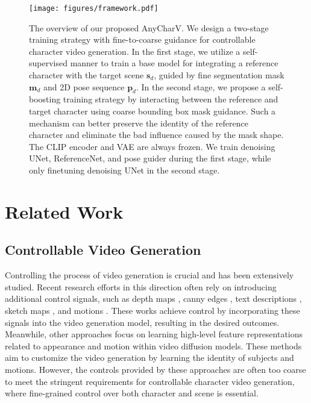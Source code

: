 \begin{figure*}[t]
    \centering
    \texttt{[image: figures/framework.pdf]}
    \caption{The overview of our proposed AnyCharV. We design a two-stage training strategy with fine-to-coarse guidance for controllable character video generation. In the first stage, we utilize a self-supervised manner to train a base model for integrating a reference character with the target scene $\boldsymbol{s}_d$, guided by fine segmentation mask $\boldsymbol{m}_d$ and 2D pose sequence $\boldsymbol{p}_d$. In the second stage, we propose a self-boosting training strategy by interacting between the reference and target character using coarse bounding box mask guidance. Such a mechanism can better preserve the identity of the reference character and eliminate the bad influence caused by the mask shape. The CLIP encoder and VAE are always frozen. We train denoising UNet, ReferenceNet, and pose guider during the first stage, while only finetuning denoising UNet in the second stage.}
    \label{fig:framework}
\end{figure*}



\section{Related Work}

\subsection{Controllable Video Generation}
Controlling the process of video generation is crucial and has been extensively studied. 
Recent research efforts in this direction often rely on introducing additional control signals, such as depth maps \cite{chai2023stablevideo, zhang2023controlvideo, wang2024videocomposer}, canny edges \cite{zhang2023controlvideo}, text descriptions \cite{zhang2023i2vgen}, sketch maps \cite{wang2024videocomposer}, and motions \cite{wang2024videocomposer}. 
These works achieve control by incorporating these signals into the video generation model, resulting in the desired outcomes.
Meanwhile, other approaches focus on learning high-level feature representations related to appearance \cite{he2024id, wang2024customvideo, wei2024dreamvideo} and motion \cite{wu2024motionbooth, yang2024direct, zhao2025motiondirector} within video diffusion models. 
These methods aim to customize the video generation by learning the identity of subjects and motions.
However, the controls provided by these approaches are often too coarse to meet the stringent requirements for controllable character video generation, where fine-grained control over both character and scene is essential.


